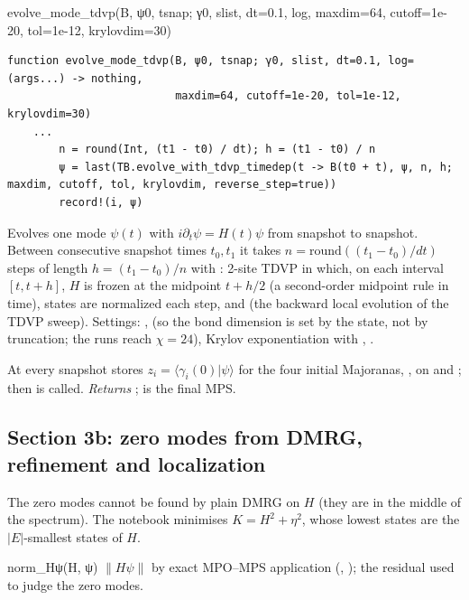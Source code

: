 \begin{function}{evolve\_mode\_tdvp(B, ψ0, tsnap; γ0, slist, dt=0.1, log, maxdim=64, cutoff=1e-20, tol=1e-12, krylovdim=30)}
\begin{Verbatim}
function evolve_mode_tdvp(B, ψ0, tsnap; γ0, slist, dt=0.1, log=(args...) -> nothing,
                          maxdim=64, cutoff=1e-20, tol=1e-12, krylovdim=30)
    ...
        n = round(Int, (t1 - t0) / dt); h = (t1 - t0) / n
        ψ = last(TB.evolve_with_tdvp_timedep(t -> B(t0 + t), ψ, n, h; maxdim, cutoff, tol, krylovdim, reverse_step=true))
        record!(i, ψ)
\end{Verbatim}
Evolves one mode $\psi(t)$ with $i\partial_t\psi = H(t)\psi$ from snapshot to snapshot. Between consecutive snapshot times $t_0, t_1$ it takes
$n = \mathrm{round}((t_1-t_0)/dt)$ steps of length $h = (t_1-t_0)/n$ with : 2-site TDVP in which, on each
interval $[t, t+h]$, $H$ is frozen at the midpoint $t+h/2$ (a second-order midpoint rule in time), states are normalized each step,
and  (the backward local evolution of the TDVP sweep). Settings: ,  (so
the bond dimension is set by the state, not by truncation; the runs reach $\chi = 24$), Krylov exponentiation with ,
.

At every snapshot  stores $z_{i} = \langle\gamma_i(0)|\psi\rangle$ for the four initial Majoranas, ,
 on  and ; then  is called.
\emph{Returns} ;  is the final MPS.
\end{function}

\subsection{Section 3b: zero modes from DMRG, refinement and localization}

The zero modes cannot be found by plain DMRG on $H$ (they are in the middle of the spectrum). The notebook minimises
$K = H^2 + \eta^2$, whose lowest states are the $|E|$-smallest states of $H$.

\begin{function}{norm\_Hψ(H, ψ)}
$\|H\psi\|$ by exact MPO--MPS application (, ); the residual used to judge the zero modes.
\end{function}


